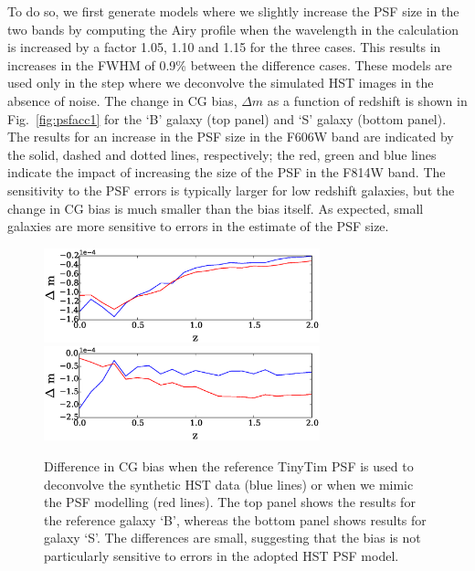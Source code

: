 \documentclass[useAMS,usenatbib]{mnras}
\begin{document}
To do so, we first generate models where we slightly increase the PSF size in the two bands by computing the  Airy profile when the wavelength in the calculation is increased by a factor 1.05, 1.10 and 1.15 for the three cases. This results in increases in the FWHM of 0.9\% between the difference cases.  These models are used only in the step where we deconvolve the simulated HST images in the absence of noise. The change in CG bias, $\Delta m$ as a function of redshift is shown in Fig.~\ref{fig:psfacc1} for the `B' galaxy (top panel) and `S' galaxy (bottom panel).  The results for an increase in the PSF size in  the F606W band are indicated by the solid, dashed and dotted lines, respectively; the red, green and blue lines indicate the impact of increasing the size of the PSF in the F814W band. The sensitivity to the PSF errors is typically larger for low redshift galaxies, but the change in CG bias is much smaller than the bias itself.  As expected, small galaxies are more sensitive to errors in the estimate of the PSF size.

\begin{figure}
\includegraphics[width=8.0cm]{ztinytim_b.eps}
\includegraphics[width=8.0cm]{ztinytim_s.eps}
\caption{Difference in CG bias when the reference {\sc TinyTim} PSF is used to deconvolve
the synthetic HST data (blue lines) or when we mimic the PSF modelling (red lines). The top
panel shows the results for the reference galaxy `B', whereas the bottom panel shows results
for galaxy `S'. The differences are small, suggesting that the bias is not particularly sensitive to 
errors in the adopted HST PSF model.}
\label{fig:psfacc2}
\end{figure}
\end{document}
